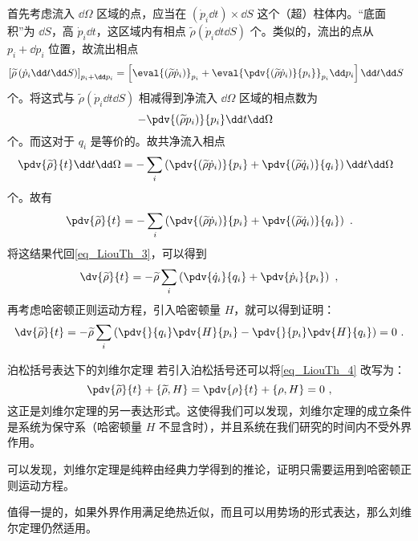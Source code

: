 首先考虑流入 $\dd \Omega$ 区域的点，应当在 $\left(\dot p_i \dd t\right) \times \dd S$ 这个（超）柱体内。“底面积”为 $\dd S$，高 $\dot p_i \dd t$，这区域内有相点 $\widetilde \rho \left(\dot p_i \dd t \dd S \right)$ 个。类似的，流出的点从 $p_i + \dd p_i$ 位置，故流出相点
$$
\left[\widetilde \rho \left(\dot p_i \dd t \dd S\right)\right]_{p_i + \dd p_i} = \left[ \eval{\left(\widetilde\rho \dot p_i\right)}_{p_i} + \eval{\pdv{\left(\widetilde\rho \dot p_i\right)}{p_i}}_{p_i} \dd p_i \right] \dd t \dd S ~~
$$
个。将这式与 $\widetilde \rho \left(\dot p_i \dd t \dd S\right)$ 相减得到净流入 $\dd \Omega$ 区域的相点数为
\begin{equation}
- \pdv{\left(\widetilde \rho p_i\right)}{p_i} \dd t \dd \Omega ~~
\end{equation}
个。而这对于 $q_i$ 是等价的。故共净流入相点
\begin{equation}
\pdv{\widetilde \rho}{t} \dd t \dd \Omega = - \sum_{i} \left(\pdv{\left(\widetilde \rho \dot p_i\right)}{p_i} + \pdv{\left(\widetilde \rho \dot q_i\right)}{q_i}\right) \dd t \dd \Omega ~~
\end{equation}
个。故有
\begin{equation}\label{eq_LiouTh_2}
\pdv{\widetilde \rho}{t} = -\sum_{i} \left(\pdv{\left(\widetilde \rho \dot p_i\right)}{p_i} + \pdv{\left(\widetilde \rho \dot q_i\right)}{q_i}\right) ~.
\end{equation}
将这结果代回\autoref{eq_LiouTh_3}，可以得到
\begin{equation}
\dv{\widetilde \rho}{t} = -\widetilde \rho \sum_{i} \left(\pdv{\dot q_i}{q_i} + \pdv{\dot p_i}{p_i}\right) ~,
\end{equation}
再考虑哈密顿正则运动方程，引入哈密顿量 $H$，就可以得到证明：
\begin{equation}\label{eq_LiouTh_4}
\dv{\widetilde \rho}{t} = -\widetilde \rho \sum_{i} \left(\pdv{}{q_i} \pdv{H}{p_i} - \pdv{}{p_i} \pdv{H}{q_i}\right) = 0 ~.
\end{equation}

\begin{corollary}{泊松括号表达下的刘维尔定理}
若引入泊松括号还可以将\autoref{eq_LiouTh_4} 改写为：
\begin{equation}
\pdv{\widetilde \rho}{t} + \{\widetilde \rho, H\} = \pdv{\rho}{t} + \{\rho , H\} = 0 ~,
\end{equation}
这正是刘维尔定理的另一表达形式。这使得我们可以发现，刘维尔定理的成立条件是系统为保守系（哈密顿量 $H$ 不显含时），并且系统在我们研究的时间内不受外界作用。

可以发现，刘维尔定理是纯粹由经典力学得到的推论，证明只需要运用到哈密顿正则运动方程。

值得一提的，如果外界作用满足绝热近似，而且可以用势场的形式表达，那么刘维尔定理仍然适用。
\end{corollary}

